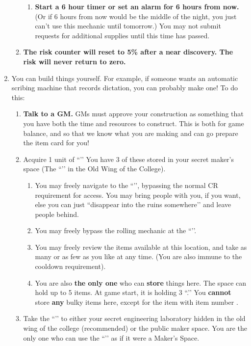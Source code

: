 \documentclass[green]{GL2020}
\begin{document}
\begin{enumerate}
\begin{enumerate}
    \begin{enumerate}
      \item \textbf{Start a 6 hour timer or set an alarm for 6 hours from now.} (Or if 6 hours from now would be the middle of the night, you just can’t use this mechanic until tomorrow.) You may not submit requests for additional supplies until this time has passed.
    \end{enumerate}
    \item \textbf{The risk counter will reset to 5\% after a near discovery. The risk will never return to zero.}
  \end{enumerate}
  \item You can build things yourself. For example, if someone wants an automatic scribing machine that records dictation, you can probably make one! To do this:
  \begin{enumerate}
    \item \textbf{Talk to a GM.} GMs must approve your construction as something that you have both the time and resources to construct. This is both for game balance, and so that we know what you are making and can go prepare the item card for you!
    \item Acquire 1 unit of ``\iMagitechParts{}’’ You have 3 of these stored in your secret maker’s space (The ``\sAlchemyLabOne{}’’ in the Old Wing of the College).
  \begin{enumerate}
    \item You may freely navigate to the ``\sAlchemyLabOne{}’’, bypassing the normal CR requirement for access. You may bring people with you, if you want, else you can just ``disappear into the ruins somewhere'’ and leave people behind.
    \item You may freely bypass the rolling mechanic at  the ``\sAlchemyLabOne{}’’.
    \item You may freely review the items available at this location, and take as many or as few as you like at any time. (You are also immune to the cooldown requirement).
    \item You are also \textbf{the only one} who can \textbf{store} things here. The space can hold up to 5 items. At game start, it is holding 3 ``\iMagitechParts{}.’’ You \textbf{cannot} store \textbf{any} bulky items here, except for the item with item number \iAvatarRabbit{\MYnumber}.
  \end{enumerate}
  \item Take the ``\iMagitechParts{}’’ to either your secret engineering laboratory hidden in the old wing of the college (recommended) or the public maker space. You are the only one who can use the ``\sAlchemyLabOne{}’’ as if it were a Maker’s Space.

\end{enumerate}
\end{enumerate}
\end{document}
